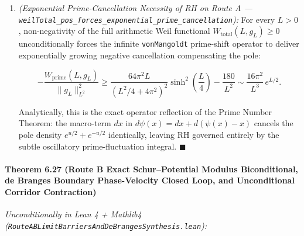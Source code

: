 \documentclass[
  11pt,
]{article}
\begin{document}
\begin{enumerate}
  Hence \textbf{no} finite subset of primes and \textbf{no} bounded-norm
  perturbation of the Archimedean operator can ever sustain Weil
  positivity globally across all horizons \(L > 0\).
\item
  \emph{(Exponential Prime-Cancellation Necessity of RH on Route A ---
  \texttt{weilTotal\_pos\_forces\_exponential\_prime\_cancellation}):}
  For every \(L > 0\), non-negativity of the full arithmetic Weil
  functional \(W_{\text{total}}(L, g_L) \ge 0\) unconditionally forces
  the infinite \texttt{vonMangoldt} prime-shift operator to deliver
  exponentially growing negative cancellation compensating the pole:

  \[-\frac{W_{\text{prime}}(L, g_L)}{\|g_L\|_{L^2}^2} \ge \frac{64\pi^2 L}{(L^2/4 + 4\pi^2)^2}\sinh^2\!\left(\frac{L}{4}\right) - \frac{180}{L^2} \sim \frac{16\pi^2}{L^3}\,e^{L/2}.\]

  Analytically, this is the exact operator reflection of the Prime
  Number Theorem: the macro-term \(dx\) in
  \(d\psi(x) = dx + d(\psi(x) - x)\) cancels the pole density
  \(e^{u/2} + e^{-u/2}\) identically, leaving RH governed entirely by
  the subtle oscillatory prime-fluctuation integral. \(\blacksquare\)
\end{enumerate}

\paragraph{Theorem 6.27 (Route B Exact Schur--Potential Modulus
Biconditional, de Branges Boundary Phase-Velocity Closed Loop, and
Unconditional Corridor
Contraction)}\label{theorem-6.27-route-b-exact-schurpotential-modulus-biconditional-de-branges-boundary-phase-velocity-closed-loop-and-unconditional-corridor-contraction}

\emph{Unconditionally in Lean 4 + Mathlib4
(\texttt{RouteABLimitBarriersAndDeBrangesSynthesis.lean}):}
\end{document}
